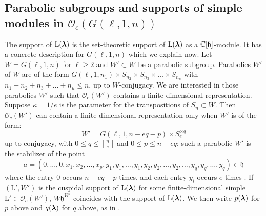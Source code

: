 \documentclass[12pt]{amsart}
\numberwithin{equation}{section}
\theoremstyle{definition}
\newcommand{\oh}{\mathcal{O}}
\newcommand{\el}{\mathrm{L}}
\newcommand{\mfh}{\mathfrak{h}}
\begin{document}
\subsection{Parabolic subgroups and supports of simple modules in $\oh_c(G(\ell,1,n))$}\label{support} The support of $\el(\bla)$ is the set-theoretic support of $\el(\bla)$ as a $\mathbb{C}[\mathfrak{h}]$-module. It has a concrete description for $G(\ell,1,n)$ which we explain now. Let $W=G(\ell,1,n)$ for $\ell\geq 2$ and $W'\subset W$ be a parabolic subgroup. %
Parabolics $W'$ of $W$ are of the form $G(\ell,1,n_1)\times S_{n_2}\times S_{n_3}\times\dots\times S_{n_u}$ with $n_1+n_2+n_3+\dots+n_u\leq n$, up to $W$-conjugacy. We are interested in those parabolics $W'$ such that $\oh_c(W')$ contains a finite-dimensional representation. Suppose $\kappa=1/e$ is the parameter for the transpositions of $S_n\subset W$. Then $\oh_c(W')$ can contain a finite-dimensional representation only when $W'$ is of the form: 
$$W'=G(\ell,1,n-eq-p)\times S_e^{\times q}$$
up to conjugacy, with $0\leq q\leq \left\lfloor\frac{n}{e}\right\rfloor$ and $0\leq p\leq n-eq$; such a parabolic $W'$ is the stabilizer of the point 
$$a=(0,...,0,x_1,x_2,\dots,x_p,y_1,y_1,\dots,y_1,y_2,y_2,\dots,y_2,\dots,y_q,y_q,\dots,y_q)\in\mfh$$
where the entry $0$ occurs $n-eq-p$ times, and each entry $y_i$ occurs $e$ times \cite{Losev2015}. 
If $(\el',W')$ is the cuspidal support of $\el(\bla)$ for some finite-dimensional simple $\el'\in\oh_c(W')$, $W\mfh^{W'}$ coincides with the support of $\el(\bla)$.   We then write $p(\boldsymbol{\lambda})$ for $p$ above and $q(\boldsymbol{\lambda})$ for $q$ above, as in \cite{Losev2015}.
\end{document}
